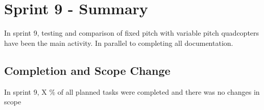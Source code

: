 \chapter{Sprint 9 - Summary}

In sprint 9, testing and comparison of fixed pitch with variable pitch quadcopters have been the main activity. In parallel to completing all documentation.


\section{Completion and Scope Change}

In sprint 9, X \% of all planned tasks were completed and there was no changes in scope
\begin{comment}

\begin{figure}[H]
    \centering
         \texttt{[image: VAPIQ-PICTURES/BDSprint9]}
      \caption{Burndown Chart Sprint 9}
    \label{fig:bds9}
\end{figure} 

\textbf{Project plan status, Sprint 8:}
\begin{itemize}
        \item Testing And Comparison , \textbf{Done}
        \item Documentation And Refinement, \textbf{Done}
    \end{itemize}
    
\end{comment}

    

